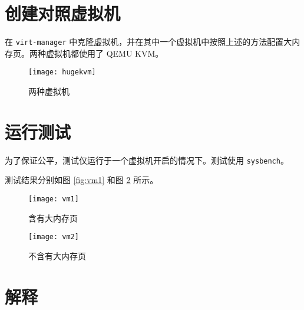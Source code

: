     \section{创建对照虚拟机}

    在 \verb"virt-manager" 中克隆虚拟机，并在其中一个虚拟机中按照上述的方法配置大内存页。两种虚拟机都使用了 QEMU KVM。

    \begin{figure}[H]
        \centering
        \texttt{[image: hugekvm]}
        \caption{两种虚拟机}\label{fig:hugekvm}
    \end{figure}

    \section{运行测试}

    为了保证公平，测试仅运行于一个虚拟机开启的情况下。测试使用 \verb"sysbench"。
    
    
    测试结果分别如图 \ref{fig:vm1} 和图 \ref{fig:vm2} 所示。

    \begin{figure}[H]
        \centering
        \begin{minipage}{0.48\textwidth}
            \centering
            \texttt{[image: vm1]}
            \caption{含有大内存页}\label{fig:vm1}
        \end{minipage}
        \begin{minipage}{0.48\textwidth}
            \centering
            \texttt{[image: vm2]}
            \caption{不含有大内存页}\label{fig:vm2}
        \end{minipage}
    \end{figure}

    \section{解释}

